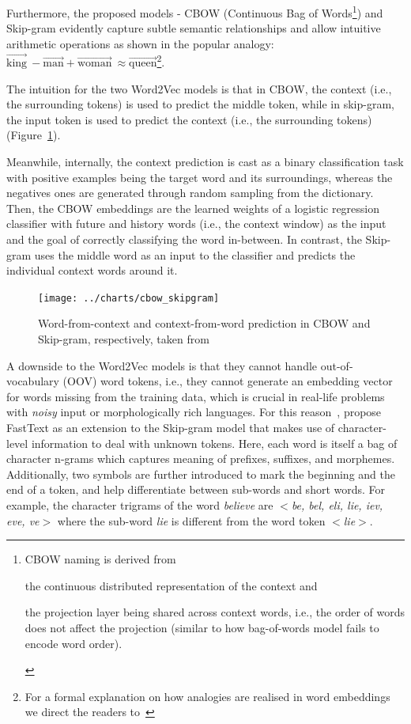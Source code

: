 Furthermore, the proposed models - CBOW (Continuous Bag of Words\footnote{
    CBOW naming is derived from \begin{enumerate*}
        \item the continuous distributed representation of the context and
        \item the projection layer being shared across context words, i.e., the order of words does not affect the projection (similar to how bag-of-words model fails to encode word order).
    \end{enumerate*}
}) and Skip-gram evidently capture subtle semantic relationships and allow intuitive arithmetic operations as shown in the popular analogy: $\overrightarrow{\text{king}}\ - \overrightarrow{\text{man}} +\overrightarrow{\text{woman}}\ \approx \overrightarrow{\text{queen}}$\footnote{
    For a formal explanation on how analogies are realised in word embeddings we direct the readers to~\cite{ethayarajh-etal-2019-towards}
}.


The intuition for the two Word2Vec models is that in CBOW, the context (i.e., the surrounding tokens) is used to predict the middle token, while in skip-gram, the input token is used to predict the context (i.e., the surrounding tokens) (Figure~\ref{fig:cbow_skipgram}).

Meanwhile, internally, the context prediction is cast as a binary classification task with positive examples being the target word and its surroundings, whereas the negatives ones are generated through random sampling from the dictionary.
Then, the CBOW embeddings are the learned weights of a logistic regression classifier with future and history words (i.e., the context window) as the input and the goal of correctly classifying the word in-between.
In contrast, the Skip-gram uses the middle word as an input to the classifier and predicts the individual context words around it.

\begin{figure}[ht]
    \centering
    \texttt{[image: ../charts/cbow\_skipgram]}~\caption{Word-from-context and context-from-word prediction in CBOW and Skip-gram, respectively, taken from~\cite{mikolov2013efficient}}
    \label{fig:cbow_skipgram}
\end{figure}

A downside to the Word2Vec models is that they cannot handle out-of-vocabulary (OOV) word tokens, i.e., they cannot generate an embedding vector for words missing from the training data, which is crucial in real-life problems with \emph{noisy} input or morphologically rich languages.
For this reason~\cite{bojanowski-etal-2017-enriching}, propose FastText as an extension to the Skip-gram model that makes use of character-level information to deal with unknown tokens.
Here, each word is itself a bag of character n-grams which captures meaning of prefixes, suffixes, and morphemes.
Additionally, two symbols are further introduced to mark the beginning and the end of a token, and help differentiate between sub-words and short words.
For example, the character trigrams of the word \emph{believe} are \emph{$<$be, bel, eli, lie, iev, eve, ve$>$} where the sub-word \emph{lie} is different from the word token \emph{$<$lie$>$}.


